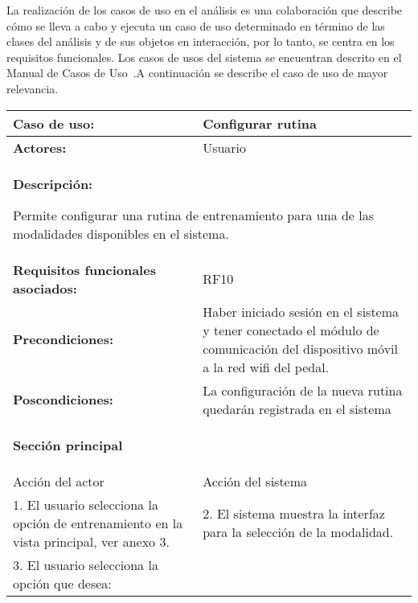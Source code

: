 La realización de los casos de uso en el análisis es una colaboración que describe cómo se lleva a cabo y ejecuta un caso de uso determinado en término de las clases del análisis y de sus objetos en interacción, por lo tanto, se centra en los requisitos funcionales. Los casos de usos del sistema se encuentran descrito en el Manual de Casos de Uso~\cite{casosdeuso}.A continuación se describe el caso de uso de mayor relevancia.

\begin{table}
    \vspace*{-60pt}
    \hspace*{-48pt}
    \begin{tabularx}{1.2\textwidth}{|X|X|}
        \hline
        \textbf{Caso de uso:} & Configurar rutina \\\hline
        \textbf{Actores:}     & Usuario \\\hline
        
        \multicolumn{2}{|X|}{        
        \begin{minipage}[t]{0.950\columnwidth}
            \textbf{Descripción:}

            Permite configurar una rutina de entrenamiento para una de las modalidades disponibles en el sistema.
        \end{minipage}} \\\hline

        \textbf{Requisitos funcionales asociados:} &  RF10\\\hline
        \textbf{Precondiciones:} & Haber iniciado sesión en el sistema y tener conectado el módulo de comunicación del dispositivo móvil a la red wifi del pedal. \\\hline
        \textbf{Poscondiciones:} & La configuración de la nueva rutina quedarán registrada en el sistema \\\hline
        
        \multicolumn{2}{|X|}{        
        \begin{minipage}[t]{0.925\columnwidth}
            \begin{center}
                \textbf{Sección principal}
            \end{center}
        \end{minipage}} \\\hline
        
        Acción del actor & Acción del sistema \\\hline
        1. El usuario selecciona la opción de entrenamiento en la vista principal, ver anexo 3. & 2. El sistema muestra la interfaz para la selección de la modalidad. \\\hline
        3. El usuario selecciona la opción que desea:
        

\end{tabularx}
\end{table}
